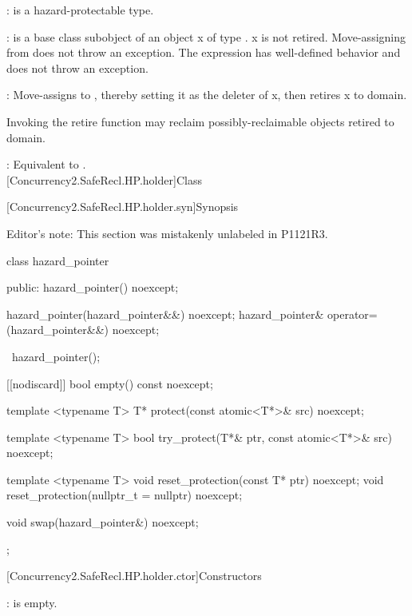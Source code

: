 \pnum
{}:  is a hazard-protectable type.

\pnum
{}:  is a base class subobject of an object x of type . x is not retired.
Move-assigning  from  does not throw an exception. The expression  has well-defined behavior and does not throw an exception.

\pnum
{}: Move-assigns  to , thereby setting it as the deleter of x, then retires x
to domain.

\pnum
Invoking the retire function may reclaim possibly-reclaimable objects retired to domain.
\\


\pnum
{}: Equivalent to .
\\

[Concurrency2.SafeRecl.HP.holder]{Class }

[Concurrency2.SafeRecl.HP.holder.syn]{Synopsis}

Editor's note: This section was mistakenly unlabeled in P1121R3.

\begin{codeblock}
class hazard_pointer {
public:
  hazard_pointer() noexcept;

  hazard_pointer(hazard_pointer&&) noexcept;
  hazard_pointer& operator=(hazard_pointer&&) noexcept;

  ~hazard_pointer();
  
  [[nodiscard]] bool empty() const noexcept;
  
  template <typename T> T* protect(const atomic<T*>& src) noexcept;
  
  template <typename T> bool try_protect(T*& ptr, const atomic<T*>& src) noexcept;
  
  template <typename T> void reset_protection(const T* ptr) noexcept;
  void reset_protection(nullptr_t = nullptr) noexcept;
  
  void swap(hazard_pointer&) noexcept;
};
\end{codeblock}

[Concurrency2.SafeRecl.HP.holder.ctor]{Constructors}


\pnum
{}:  is empty.
\\


